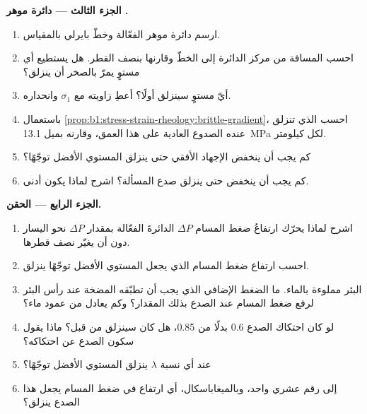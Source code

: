 \begin{problem}
\medskip
\noindent\textbf{الجزء الثالث --- دائرة موهر .}
\begin{enumerate}[resume]
  \item ارسم دائرة موهر الفعّالة وخطّ بايرلي بالمقياس.
  \item احسب المسافة من مركز الدائرة إلى الخطّ وقارنها بنصف القطر. هل يستطيع أي مستوٍ يمرّ بالصخر أن ينزلق؟
  \item أيّ مستوٍ سينزلق أولًا؟ أعطِ زاويته مع $\sigma_1$ وانحداره.
  \item باستعمال \cref{prop:b1:stress-strain-rheology:brittle-gradient}، احسب  الذي تنزلق عنده الصدوع العادية على هذا العمق، وقارنه بميل \qty{13.1}{MPa} لكل كيلومتر.
  \item كم يجب أن ينخفض الإجهاد الأفقي حتى ينزلق المستوي الأفضل توجّهًا؟
  \item كم يجب أن ينخفض حتى ينزلق صدع المسألة؟ اشرح لماذا يكون أدنى.
\end{enumerate}

\medskip
\noindent\textbf{الجزء الرابع --- الحقن.}
\begin{enumerate}[resume]
  \item اشرح لماذا يحرّك ارتفاعُ ضغط المسام $\Delta P$ الدائرةَ الفعّالة بمقدار $\Delta P$ نحو اليسار دون أن يغيّر نصف قطرها.
  \item احسب ارتفاع ضغط المسام الذي يجعل المستوي الأفضل توجّهًا ينزلق.
  \item البئر مملوءة بالماء. ما الضغط الإضافي الذي يجب أن تطبّقه المضخة عند رأس البئر لرفع ضغط المسام عند الصدع بذلك المقدار؟ وكم يعادل من عمود ماء؟
  \item لو كان احتكاك الصدع 0.6 بدلًا من 0.85، هل كان سينزلق من قبل؟ ماذا يقول سكون الصدع عن احتكاكه؟
  \item عند أي نسبة $\lambda$ ينزلق المستوي الأفضل توجّهًا؟
  \item إلى رقم عشري واحد، وبالميغاباسكال، أي ارتفاع في ضغط المسام يجعل هذا الصدع ينزلق؟
\end{enumerate}
\end{problem}
